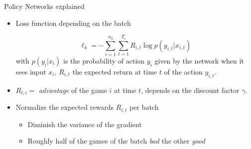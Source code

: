 \documentclass{beamer}
\begin{document}
\begin{frame}{Policy Networks explained}

\begin{itemize}

\item Loss function depending on the batch




\[\ell_k = - \sum_{i = 1}^{n_b} \sum_{t = 1}^{T_i} R_{i, t} \log p(y_{i, t} | x_{i, t})\]
with $p(y_i | x_i)$ is the probability of action $y_i$ given by the network when it sees input $x_i$,  $R_{i, t}$ the expected return at time $t$ of the action $y_{i, t}$.

\item $R_{t, i} = $ \textit{advantage} of the game $i$ at time $t$, depends on the discount factor $\gamma$. %

\item Normalize the expected rewards $R_{i, t}$ per batch
\begin{itemize}
\item Diminish the variance of the gradient%
\item Roughly half of the games of the batch \textit{bad} the other \textit{good}%
\end{itemize}
\end{itemize}

\end{frame}
\end{document}

